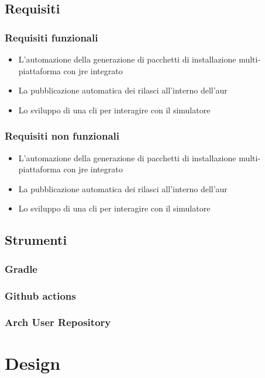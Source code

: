 \documentclass[12pt,a4paper,openright,twoside]{book}
\begin{document}
\section{Requisiti}

\subsection{Requisiti funzionali}
\begin{itemize}
	\item L'automazione della generazione di pacchetti di installazione multi-piattaforma con \ac{jre} integrato
	\item La pubblicazione automatica dei rilasci all'interno dell'\ac{aur}
	\item Lo sviluppo di una \ac{cli} per interagire con il simulatore
\end{itemize}

\subsection{Requisiti non funzionali}
\begin{itemize}
	\item L'automazione della generazione di pacchetti di installazione multi-piattaforma con \ac{jre} integrato
	\item La pubblicazione automatica dei rilasci all'interno dell'\ac{aur}
	\item Lo sviluppo di una \ac{cli} per interagire con il simulatore
\end{itemize}

\section{Strumenti}

\subsection{Gradle}

\subsection{Github actions}

\subsection{Arch User Repository}

\chapter{Design}
\end{document}
